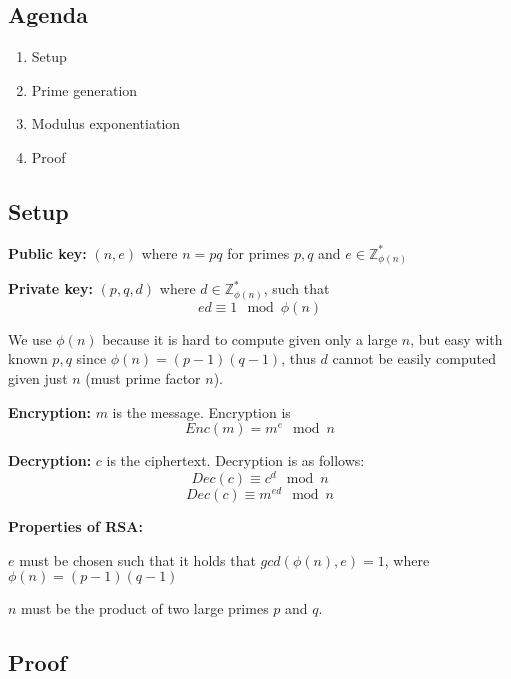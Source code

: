 

\subsection*{Agenda}
\begin{enumerate}
\item Setup
\item Prime generation
\item Modulus exponentiation
\item Proof
\end{enumerate}
\subsection{Setup}
\textbf{Public key:} $(n, e)$ where $n = pq$ for primes $p, q$ and $e \in \mathbb{Z}_{\phi(n)}^*$

\textbf{Private key:} $(p, q, d)$ where $d \in \mathbb{Z}_{\phi(n)}^*$, such that
\[ ed \equiv 1 \mod \phi(n) \]

We use $\phi(n)$ because it is hard to compute given only a large $n$, but easy with known $p, q$ since $\phi(n) = (p-1)(q-1)$, thus $d$ cannot be easily computed given just $n$ (must prime factor $n$).

\textbf{Encryption:} $m$ is the message. Encryption is
\[ Enc(m) = m^e \mod n \]

\textbf{Decryption:} $c$ is the ciphertext. Decryption is as follows:
\[ Dec(c) \equiv c^d \mod n \]
\[ Dec(c) \equiv m^{ed} \mod n \]

\textbf{Properties of RSA:}

$e$ must be chosen such that it holds that $gcd(\phi(n),e) = 1$, where
$\phi(n) = (p - 1)(q - 1)$

$n$ must be the product of two large primes $p$ and $q$.

\subsection{Proof}
